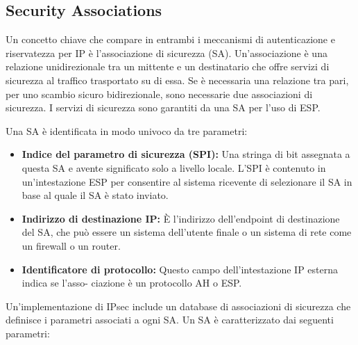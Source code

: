 \subsection{Security Associations}
Un concetto chiave che compare in entrambi i meccanismi di autenticazione e riservatezza per IP è l'associazione di sicurezza (SA). Un'associazione è una relazione unidirezionale tra un mittente e un destinatario che offre servizi di sicurezza al traffico trasportato su di essa. Se è necessaria una relazione tra pari, per uno scambio sicuro bidirezionale, sono necessarie due associazioni di sicurezza. I servizi di sicurezza sono garantiti da una SA per l'uso di ESP.

\singlespacing

Una SA è identificata in modo univoco da tre parametri:

\begin{itemize}
    \item \textbf{Indice del parametro di sicurezza (SPI):} Una stringa di bit assegnata a questa SA e avente significato solo a livello locale. L'SPI è contenuto in un'intestazione ESP per consentire al sistema ricevente di selezionare il SA in base al quale il SA è stato inviato.
    
    \item \textbf{Indirizzo di destinazione IP:} È l'indirizzo dell'endpoint di destinazione del SA, che può essere un sistema dell'utente finale o un sistema di rete come un firewall o un router.
    
    \item \textbf{Identificatore di protocollo:} Questo campo dell'intestazione IP esterna indica se l'asso- ciazione è un protocollo AH o ESP.
\end{itemize}
Un'implementazione di IPsec include un database di associazioni di sicurezza che definisce i parametri associati a ogni SA. Un SA è caratterizzato dai seguenti parametri:

